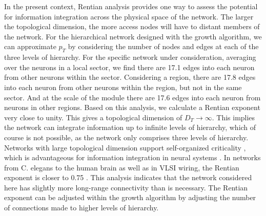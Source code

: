 \documentclass[aip,amsmath,amssymb,reprint,nofootinbib]{revtex4-1}
\begin{document}
In the present context, Rentian analysis provides one way to assess the potential for information integration across the physical space of the network. The larger the topological dimension, the more access nodes will have to distant members of the network. For the hierarchical network designed with the growth algorithm, we can approximate $p_T$ by considering the number of nodes and edges at each of the three levels of hierarchy. For the specific network under consideration, averaging over the neurons in a local sector, we find there are 17.1 edges into each neuron from other neurons within the sector. Considering a region, there are 17.8 edges into each neuron from other neurons within the region, but not in the same sector. And at the scale of the module there are 17.6 edges into each neuron from neurons in other regions. Based on this analysis, we calculate a Rentian exponent very close to unity. This gives a topological dimension of $D_T \rightarrow \infty$. This implies the network can integrate information up to infinite levels of hierarchy, which of course is not possible, as the network only comprises three levels of hierarchy. Networks with large topological dimension support self-organized criticality \cite{be2007,rusp2011}, which is advantageous for information integration in neural systems \cite{be2007,kism2009,shya2009,ch2010,rusp2011}. In networks from C. elegans to the human brain as well as in VLSI wiring, the Rentian exponent is closer to 0.75 \cite{bagr2010}. This analysis indicates that the network considered here has slightly more long-range connectivity than is necessary. The Rentian exponent can be adjusted within the growth algorithm by adjusting the number of connections made to higher levels of hierarchy.  
	
\end{document}
